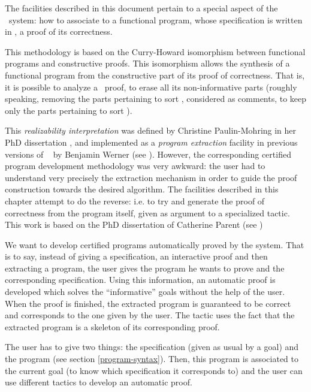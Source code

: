 \label{Addoc-program}

The facilities described in this document pertain to a special aspect of
the \Coq\ system: how to associate to a functional program, whose 
specification is written in \gallina, a proof of its correctness.

This methodology is based on the Curry-Howard isomorphism between
functional programs and constructive proofs. This isomorphism allows
the synthesis of a functional program from the constructive part of its
proof of correctness. That is, it is possible to analyze a \Coq\ proof,
to erase all its non-informative parts (roughly speaking, removing the
parts pertaining to sort \Prop, considered as comments, to keep only the
parts pertaining to sort \Set). 

This {\sl realizability interpretation}
was defined by Christine Paulin-Mohring in her PhD dissertation 
\cite{Moh89b}, and
implemented as a {\sl program extraction} facility in previous versions of 
\Coq~ by Benjamin Werner (see \cite{COQ93}). 
However, the corresponding certified program
development methodology was very awkward: the user had to understand very 
precisely the extraction mechanism in order to guide the proof construction
towards the desired algorithm. The facilities described in this chapter 
attempt to do the reverse: i.e. to try and generate the proof of correctness
from the program itself, given as argument to a specialized tactic.
This work is based on the PhD dissertation of 
Catherine Parent (see \cite{CPar95})

\label{program_proving}

We want to develop certified programs automatically proved by the
system. That is to say, instead of giving a specification, an
interactive proof and then extracting a program, the user gives the
program he wants to prove and the corresponding specification. Using
this information, an automatic proof is developed which solves the
``informative'' goals without the help of the user. When the proof is
finished, the extracted program is guaranteed to be correct and
corresponds to the one given by the user. The tactic uses the fact
that the extracted program is a skeleton of its corresponding proof.

The user has to give two things: the specification (given as usual by
a goal) and the program (see section \ref{program-syntax}). Then, this program
is associated to the current goal (to know which specification it
corresponds to) and the user can use different tactics to develop an
automatic proof.

